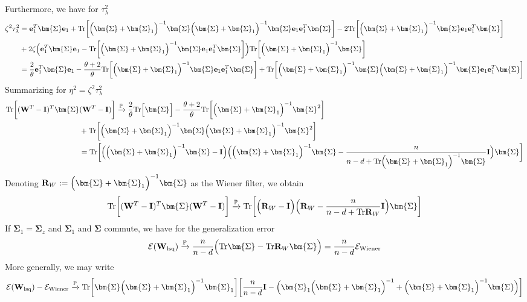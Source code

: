 \documentclass[final]{l4dc2026}
\newcommand{\bSigma}{\bm{\Sigma}}
\newcommand{\bI}{\mathbf{I}}
\newcommand{\bR}{\mathbf{R}}
\newcommand{\bW}{\mathbf{W}}
\newcommand{\be}{\mathbf{e}}
\newcommand{\bbP}{\mathbb{P}}
\newcommand{\calE}{\mathcal{E}}
\newcommand{\tr}{\text{Tr}}
\newcommand{\rarrowp}{\xrightarrow[]{\bbP}}
\begin{document}
Furthermore, we have for $\tau_{\lambda}^2$
\begin{align*}
    \zeta^2 \tau_{\lambda}^2 &=  \be_1^T \bSigma \be_1 +\tr \biggl[\Bigl(\bSigma + \bSigma_1 \Bigr)^{-1} \bSigma \Bigl(\bSigma + \bSigma_1 \Bigr)^{-1} \bSigma \be_1 \be_1^T \bSigma \biggr]- 2  \tr\biggl[\Bigl(\bSigma + \bSigma_1\Bigr)^{-1}  \bSigma \be_1 \be_1^T \bSigma\biggr]\\
    &+ 2\zeta  \Bigl(\be_1^T \bSigma \be_1 - \tr \biggl[\Bigl(\bSigma + \bSigma_1\Bigr)^{-1} \bSigma \be_1 \be_1^T \bSigma\biggr] \Bigr) \tr \biggl[\Bigl(\bSigma + \bSigma_1 \Bigr)^{-1} \bSigma\biggr] \\
    &= \frac{2}{\theta} \be_1^T \bSigma \be_1 - \frac{\theta + 2}{\theta}  \tr\biggl[\Bigl(\bSigma + \bSigma_1\Bigr)^{-1}  \bSigma \be_1 \be_1^T \bSigma\biggr]+\tr\biggl[ \Bigl(\bSigma + \bSigma_1 \Bigr)^{-1} \bSigma \Bigl(\bSigma + \bSigma_1 \Bigr)^{-1} \bSigma \be_1 \be_1^T \bSigma\biggr]
\end{align*}
Summarizing for $\eta^2 = \zeta^2 \tau_{\lambda}^2 $
\begin{align*}
     \tr \biggl[ (\bW^T - \bI)^T \bSigma &(\bW^T - \bI) \biggr]\rarrowp \frac{2}{\theta} \tr \Bigl[ \bSigma \Bigr]  - \frac{\theta + 2}{\theta}  \tr\biggl[\Bigl(\bSigma + \bSigma_1\Bigr)^{-1}  \bSigma^2 \biggr] \\
     & +\tr\biggl[\Bigl(\bSigma + \bSigma_1 \Bigr)^{-1} \bSigma \Bigl(\bSigma + \bSigma_1 \Bigr)^{-1} \bSigma^2 \biggr]\\
     &= \tr \biggl[\Bigl(\Bigl(\bSigma + \bSigma_1\Bigr)^{-1}  \bSigma - \bI \Bigr) \Bigl(\Bigl(\bSigma + \bSigma_1\Bigr)^{-1}  \bSigma - \frac{n}{n - d + \tr \Bigl(\bSigma + \bSigma_1\Bigr)^{-1}  \bSigma} \bI \Bigr) \bSigma\biggr]
\end{align*}
Denoting $\bR_{W}:= \Bigl(\bSigma + \bSigma_1\Bigr)^{-1}  \bSigma$ as the Wiener filter, we obtain
\begin{align*}
    \tr\biggl[ (\bW^T - \bI)^T \bSigma (\bW^T - \bI)\biggr] \rarrowp \tr \biggl[ \Bigl(\bR_{W} - \bI \Bigr) \Bigl(\bR_{W}  - \frac{n}{n - d + \tr \bR_{W}} \bI \Bigr) \bSigma \biggr]
\end{align*}
If $\bSigma_1 = \bSigma_z$ and $\bSigma_1$ and $\bSigma$ commute, we have for the generalization error
\begin{align*}
    \calE(\bW_{\text{lsq}}) \rarrowp \frac{n}{n-d} \Bigl( \tr \bSigma - \tr \bR_{W} \bSigma \Bigr) = \frac{n}{n-d} \cal{E}_{\text{Wiener}}
\end{align*}
More generally, we may write
\begin{align*}
     \calE(\bW_{\text{lsq}}) - \calE_{\text{Wiener}} \rarrowp  \tr \biggl[\bSigma \Bigl(\bSigma + \bSigma_1\Bigr)^{-1} \bSigma_1\biggr] \biggl[\frac{n}{n-d} \bI - \Bigl(  \bSigma_1 \Bigl(\bSigma + \bSigma_1\Bigr)^{-1} + \Bigl(\bSigma + \bSigma_1\Bigr)^{-1} \bSigma \Bigr) \biggr]
\end{align*}
\end{document}
